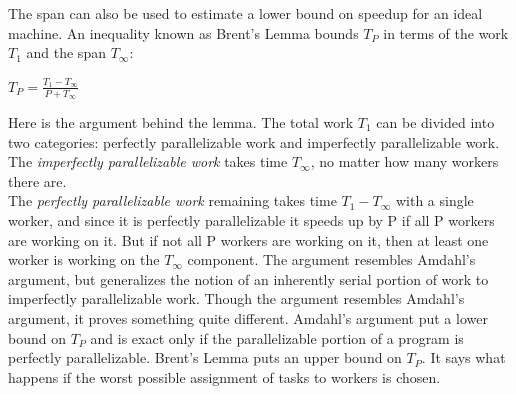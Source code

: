 The span can also be used to estimate a lower bound on speedup for an ideal machine. An inequality known as Brent's Lemma bounds \(T_{P}\) in terms of the work \(T_{1}\) and the span \(T_{\infty}\):
\begin{center}
	\(T_{P} = \frac{T_{1}-T_{\infty}}{P+T_{\infty}}\)
\end{center}
Here is the argument behind the lemma. The total work \(T_{1}\) can be divided into two categories:
perfectly parallelizable work and imperfectly parallelizable work. The \textit{imperfectly parallelizable work} takes time \(T_{\infty}\), no matter how many workers there are.\\
The \textit{perfectly parallelizable work} remaining
takes time \(T_{1}-T_{\infty}\) with a single worker, and since it is perfectly parallelizable it speeds up by P if all P workers are working on it. 
But if not all P workers are working on it, then at least one worker is working on the \(T_{\infty}\) component. The argument resembles Amdahl’s argument, but generalizes the notion of an inherently serial portion of work to imperfectly parallelizable work.
Though the argument resembles Amdahl's argument, it proves something quite different. Amdahl's argument put a lower bound on \(T_{P}\) and is exact only if the parallelizable portion of a program is perfectly parallelizable. Brent's Lemma puts an upper bound on \(T_{P}\). It says what happens if the worst
possible assignment of tasks to workers is chosen.


